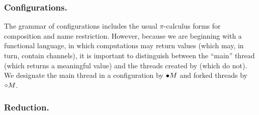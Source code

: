 \documentclass[orivec,envcountsame]{llncs}
\begin{document}

\subsubsection{Configurations.}

The grammar of configurations includes the usual $\pi$-calculus forms for composition and name
restriction.  However, because we are beginning with a functional language, in which computations
may return values (which may, in turn, contain channels), it is important to distinguish between the
``main'' thread (which returns a meaningful value) and the threads created by  (which
do not).  We designate the main thread in a configuration by ${\mathord{\bullet}} M$ and forked threads by
${\mathord{\circ}} M$.

\subsubsection{Reduction.}
\end{document}
